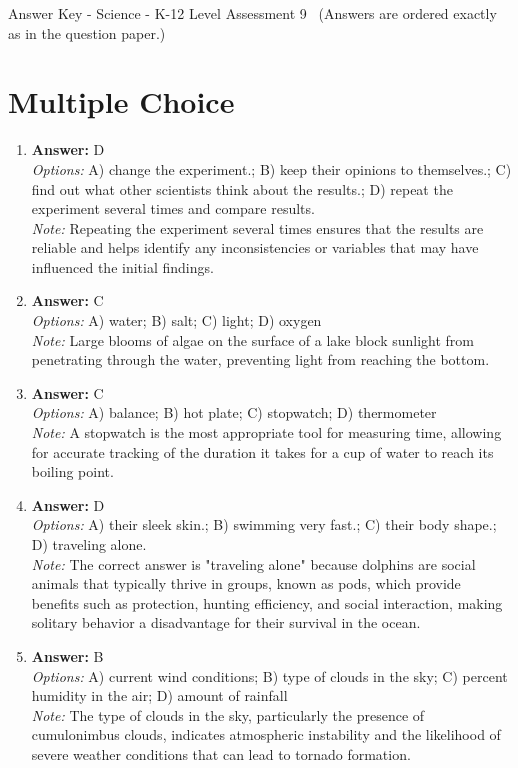 \documentclass[12pt]{article}
\begin{document}
\begin{center}
Answer Key - Science - K-12 Level Assessment 9 \
\small (Answers are ordered exactly as in the question paper.)
\end{center}

\section*{Multiple Choice}
\begin{enumerate}[label=\arabic*.]
\item \textbf{Answer:} D
\\ \textit{Options:} A) change the experiment.; B) keep their opinions to themselves.; C) find out what other scientists think about the results.; D) repeat the experiment several times and compare results.
\\ \textit{Note:} Repeating the experiment several times ensures that the results are reliable and helps identify any inconsistencies or variables that may have influenced the initial findings.
\item \textbf{Answer:} C
\\ \textit{Options:} A) water; B) salt; C) light; D) oxygen
\\ \textit{Note:} Large blooms of algae on the surface of a lake block sunlight from penetrating through the water, preventing light from reaching the bottom.
\item \textbf{Answer:} C
\\ \textit{Options:} A) balance; B) hot plate; C) stopwatch; D) thermometer
\\ \textit{Note:} A stopwatch is the most appropriate tool for measuring time, allowing for accurate tracking of the duration it takes for a cup of water to reach its boiling point.
\item \textbf{Answer:} D
\\ \textit{Options:} A) their sleek skin.; B) swimming very fast.; C) their body shape.; D) traveling alone.
\\ \textit{Note:} The correct answer is "traveling alone" because dolphins are social animals that typically thrive in groups, known as pods, which provide benefits such as protection, hunting efficiency, and social interaction, making solitary behavior a disadvantage for their survival in the ocean.
\item \textbf{Answer:} B
\\ \textit{Options:} A) current wind conditions; B) type of clouds in the sky; C) percent humidity in the air; D) amount of rainfall
\\ \textit{Note:} The type of clouds in the sky, particularly the presence of cumulonimbus clouds, indicates atmospheric instability and the likelihood of severe weather conditions that can lead to tornado formation.
\end{enumerate}
\end{document}

